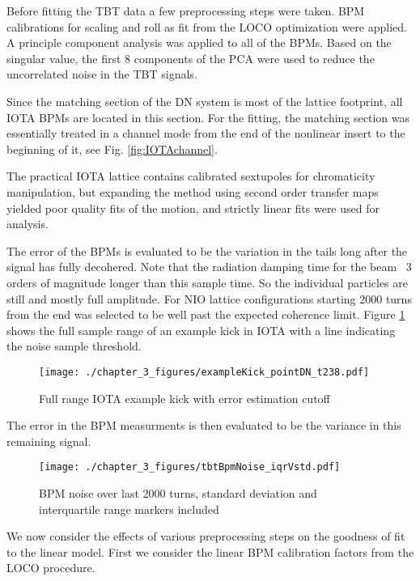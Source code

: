 Before fitting the TBT data a few preprocessing steps were taken. BPM calibrations for scaling and roll as fit from the LOCO optimization were applied. A principle component analysis was applied to all of the BPMs. Based on the singular value, the first 8 components of the PCA were used to reduce the uncorrelated noise in the TBT signals.

Since the matching section of the DN system is most of the lattice footprint, all IOTA BPMs are located in this section. For the fitting, the matching section was essentially treated in a channel mode from the end of the nonlinear insert to the beginning of it, see Fig. \ref{fig:IOTAchannel}.

The practical IOTA lattice contains calibrated sextupoles for chromaticity manipulation, but expanding the method using second order transfer maps yielded poor quality fits of the motion, and strictly linear fits were used for analysis.

The error of the BPMs is evaluated to be the variation in the tails long after the signal has fully decohered. Note that the radiation damping time for the beam ~3 orders of magnitude longer than this sample time. So the individual particles are still and mostly full amplitude. For NIO lattice configurations starting 2000 turns from the end was selected to be well past the expected coherence limit. Figure \ref{fig:bpmErrCutoff} shows the full sample range of an example kick in IOTA with a line indicating the noise sample threshold.

\begin{figure}
    \centering
    \texttt{[image: ./chapter\_3\_figures/exampleKick\_pointDN\_t238.pdf]}
    \caption{Full range IOTA example kick with error estimation cutoff}
    \label{fig:bpmErrCutoff}
\end{figure}

The error in the BPM measurments is then evaluated to be the variance in this remaining signal.

\begin{figure}
    \centering
    \texttt{[image: ./chapter\_3\_figures/tbtBpmNoise\_iqrVstd.pdf]}
    \caption{BPM noise over last 2000 turns, standard deviation and interquartile range markers included}
    \label{fig:bpmErrIQR}
\end{figure}

We now consider the effects of various preprocessing steps on the goodness of fit to the linear model. First we consider the linear BPM calibration factors from the LOCO procedure.

